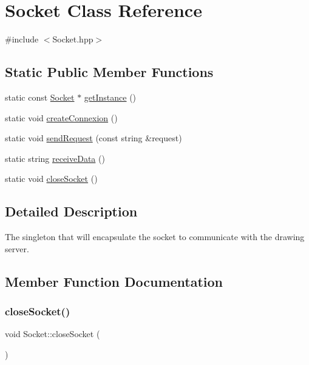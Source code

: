 \hypertarget{class_socket}{}\section{Socket Class Reference}
\label{class_socket}


{\ttfamily \#include $<$Socket.\+hpp$>$}

\subsection*{Static Public Member Functions}
\begin{DoxyCompactItemize}
\item 
static const \hyperlink{class_socket}{Socket} $\ast$ \hyperlink{class_socket_ad5d9fff005dee4de1de73ee22c42fad4}{get\+Instance} ()
\item 
static void \hyperlink{class_socket_a2571482be5b97e7b2beac7abf543a025}{create\+Connexion} ()
\item 
static void \hyperlink{class_socket_a23669198a36df9525a6248d7650661e4}{send\+Request} (const string \&request)
\item 
static string \hyperlink{class_socket_ae41cf538ddff9d547b1a6c43529e6d26}{receive\+Data} ()
\item 
static void \hyperlink{class_socket_aacc2ad59fc693055e3c0adcdbb4da209}{close\+Socket} ()
\end{DoxyCompactItemize}


\subsection{Detailed Description}
The singleton that will encapsulate the socket to communicate with the drawing server. 

\subsection{Member Function Documentation}
\hypertarget{class_socket_aacc2ad59fc693055e3c0adcdbb4da209}{}\label{class_socket_aacc2ad59fc693055e3c0adcdbb4da209} 
\subsubsection{\texorpdfstring{close\+Socket()}{closeSocket()}}
{\footnotesize\ttfamily void Socket\+::close\+Socket (\begin{DoxyParamCaption}{ }\end{DoxyParamCaption})\hspace{0.3cm}{\ttfamily [static]}}

